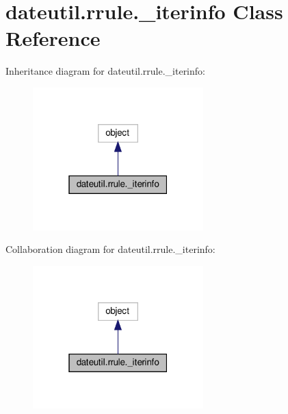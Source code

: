 \hypertarget{classdateutil_1_1rrule_1_1__iterinfo}{}\section{dateutil.\+rrule.\+\_\+iterinfo Class Reference}
\label{classdateutil_1_1rrule_1_1__iterinfo}


Inheritance diagram for dateutil.\+rrule.\+\_\+iterinfo\+:
\nopagebreak
\begin{figure}[H]
\begin{center}
\leavevmode
\includegraphics[width=187pt]{classdateutil_1_1rrule_1_1__iterinfo__inherit__graph}
\end{center}
\end{figure}


Collaboration diagram for dateutil.\+rrule.\+\_\+iterinfo\+:
\nopagebreak
\begin{figure}[H]
\begin{center}
\leavevmode
\includegraphics[width=187pt]{classdateutil_1_1rrule_1_1__iterinfo__coll__graph}
\end{center}
\end{figure}

